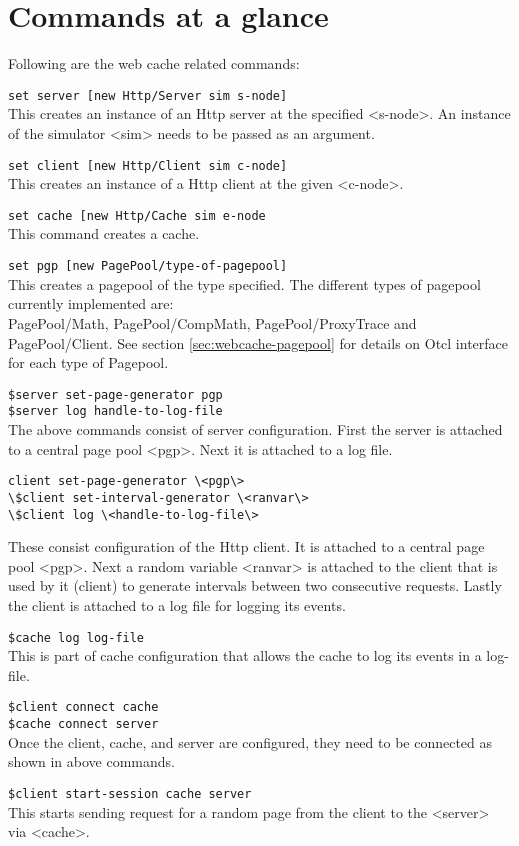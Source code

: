\section{Commands at a glance}
\label{sec:webcachecommand}

Following are the web cache related commands:
\begin{flushleft}
{\tt set server [new Http/Server \<sim\> \<s-node\>]}\\
This creates an instance of an Http server at the specified <s-node>. An
instance of the simulator <sim> needs to be passed as an argument.


{\tt set client [new Http/Client \<sim\> \<c-node\>]}\\
This creates an instance of a Http client at the given <c-node>.


{\tt set cache [new Http/Cache \<sim\> \<e-node\>}\\
This command creates a cache.


{\tt set pgp [new PagePool/\<type-of-pagepool\>]}\\
This creates a pagepool of the type specified. The different types of pagepool
currently implemented are:\\
PagePool/Math, PagePool/CompMath, PagePool/ProxyTrace and PagePool/Client.
See section \ref{sec:webcache-pagepool} for details on Otcl interface for
each type of Pagepool.


{\tt \$server set-page-generator \<pgp\>}\\
{\tt \$server log \<handle-to-log-file\>}\\
The above commands consist of server configuration. First the server is
attached to a central page pool <pgp>. Next it is attached to a log file.


\begin{verbatim}
client set-page-generator \<pgp\>
\$client set-interval-generator \<ranvar\> 
\$client log \<handle-to-log-file\>
\end{verbatim}
These consist configuration of the Http client. It is attached to a central
page pool <pgp>. Next a random variable <ranvar> is attached to the client
that is used by it (client) to generate intervals between two consecutive
requests. Lastly the client is attached to a log file for logging its events.


{\tt \$cache log \<log-file\>}\\
This is part of cache configuration that allows the cache to log its
events in a log-file. 


{\tt \$client connect \<cache\>}\\
{\tt \$cache connect \<server\>}\\
Once the client, cache, and server are configured, they need to be
connected as shown in above commands.


{\tt \$client start-session \<cache\> \<server\>}\\
This starts sending request for a random page from the client to the
<server> via <cache>.

\end{flushleft}
\endinput

